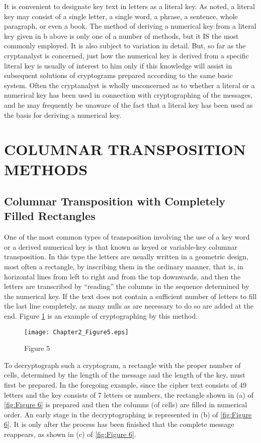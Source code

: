 \mypara It is convenient to designate key text in letters as a literal key. As
noted, a literal key may consist of a single letter, a single word, a phrase,
a sentence, whole paragraph, or even a book. The method of deriving
a numerical key from a literal key given in b above is only one of a number of methods, but it IS the most commonly employed. It is also subject to
variation in detail. But, so far as the cryptanalyst is concerned, just how
the numerical key is derived from a specific literal key is usually of
interest to him only if this knowledge will assist in subsequent solutions
of cryptograms prepared according to the same basic system. Often the
cryptanalyst is wholly unconcerned as to whether a literal or a numerical
key has been used in connection with cryptographing of the messages,
and he may frequently be unaware of the fact that a literal key has been
used as the basis for deriving a numerical key.

\section{COLUMNAR TRANSPOSITION METHODS}

\subsection{Columnar Transposition with Completely Filled Rectangles}

\mypara One of the most common types of transposition involving the use
of a key word or a derived numerical key is that known as keyed or
variable-key columnar transposition. In this type the letters are usually
written in a geometric design, most often a rectangle, by inscribing them
in the ordinary manner, that is, in horizontal lines from left to right and
from the top downwards, and then the letters are transcribed by
“reading” the columns in the sequence determined by the numerical key.
If the text does not contain a sufficient number of letters to fill the last
line completely, as many nulls as are necessary to do so are added at the
end. Figure \ref{fig:Figure 5} is an example of cryptographing by this method.

 
\begin{figure}[h]
  \centering
    \texttt{[image: Chapter2\_Figure5.eps]}
    \label{fig:Figure 5}
    \caption{Figure 5}
\end{figure}

\mypara To decryptograph such a cryptogram, a rectangle with the proper
number of cells, determined by the length of the message and the length
of the key, must first be prepared. In the foregoing example, since the
cipher text consists of 49 letters and the key consists of 7 letters or numbers, the rectangle shown in (a) of \ref{fig:Figure 6} is prepared and then the
columns (of cells) are filled in numerical order. An early stage in the
decryptographing is represented in (b) of \ref{fig:Figure 6}. It is only after the
process has been finished that the complete message reappears, as shown
in (c) of \ref{fig:Figure 6}.

